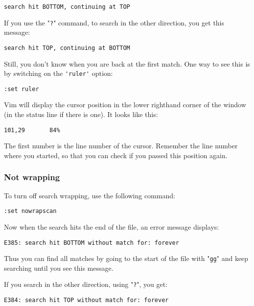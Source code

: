 \begin{Verbatim}[samepage=true]
    search hit BOTTOM, continuing at TOP 
\end{Verbatim}

If you use the "\verb!?!" command, to search in the other direction, you get this message:

\begin{Verbatim}[samepage=true]
    search hit TOP, continuing at BOTTOM 
\end{Verbatim}

Still, you don't know when you are back at the first match.
One way to see this is by switching on the \verb!'ruler'! option:

\begin{Verbatim}[samepage=true]
 :set ruler
\end{Verbatim}

Vim will display the cursor position in the lower righthand corner of the window (in the status line if there is one).
It looks like this:

\begin{Verbatim}[samepage=true]
    101,29       84% 
\end{Verbatim}

The first number is the line number of the cursor.
Remember the line number where you started, so that you can check if you passed this position again.
\subsubsection{Not wrapping}
To turn off search wrapping, use the following command:

\begin{Verbatim}[samepage=true]
 :set nowrapscan
\end{Verbatim}

Now when the search hits the end of the file, an error message displays:

\begin{Verbatim}[samepage=true]
    E385: search hit BOTTOM without match for: forever 
\end{Verbatim}

Thus you can find all matches by going to the start of the file with "\verb!gg!" and keep searching until you see this message.

If you search in the other direction, using "\verb!?!", you get:

\begin{Verbatim}[samepage=true]
    E384: search hit TOP without match for: forever 
\end{Verbatim}
